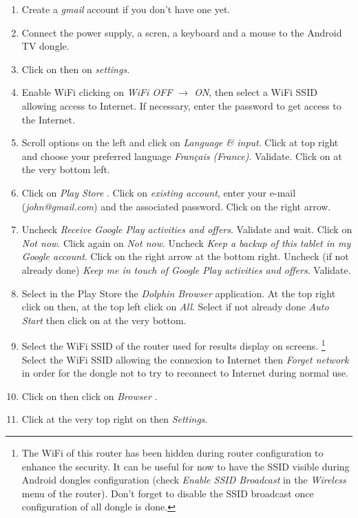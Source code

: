 \documentclass[a4paper]{ffco-rapport}
\begin{document}
	\begin{enumerate}
		\item Create a \emph{gmail} account if you don't have one yet.
		\item Connect the power supply, a scren, a keyboard and a mouse to the Android TV dongle.
		\item Click on  then on \emph{settings}. 
		\item Enable WiFi clicking on \emph{WiFi OFF $\rightarrow$ ON}, then select a WiFi SSID allowing access to Internet.
					If necessary, enter the password to get access to the Internet.
		\item Scroll options on the left and click on \emph{Language \& input}.
					Click at top right and choose your preferred language \emph{Français (France)}. Validate.
					Click on  at the very bottom left.
		\item Click on \emph{Play Store} .
					Click on \emph{existing account}, enter your e-mail (\emph{john@gmail.com}) and the associated password.
					Click on the right arrow.
		\item Uncheck \emph{Receive Google Play activities and offers}. Validate and wait.
					Click on \emph{Not now}. Click again on \emph{Not now}.
					Uncheck \emph{Keep a backup of this tablet in my Google account}.
					Click on the right arrow at the bottom right.
					Uncheck (if not already done) \emph{Keep me in touch of Google Play activities and offers}. Validate.
		\item Select in the Play Store the \emph{Dolphin Browser} application.
					At the top right click on  then, at the top left click on \emph{All}.
					Select if not already done \emph{Auto Start} then click on  at the very bottom.
		\item Select the WiFi SSID of the router used for results display on screens.
					\footnote{The WiFi of this router has been hidden during router configuration to enhance the security. It can be useful for now to have the SSID visible during Android dongles configuration (check \emph{Enable SSID Broadcast} in the \emph{Wireless} menu of the router).
					Don't forget to disable the SSID broadcast once configuration of all dongle is done.}
					Select the WiFi SSID allowing the connexion to Internet then \emph{Forget network} in order for the dongle not to try to reconnect to Internet during normal use.
		\item Click on  then click on \emph{Browser} .
		\item Click at the very top right on  then \emph{Settings}.

\end{enumerate}
\end{document}
